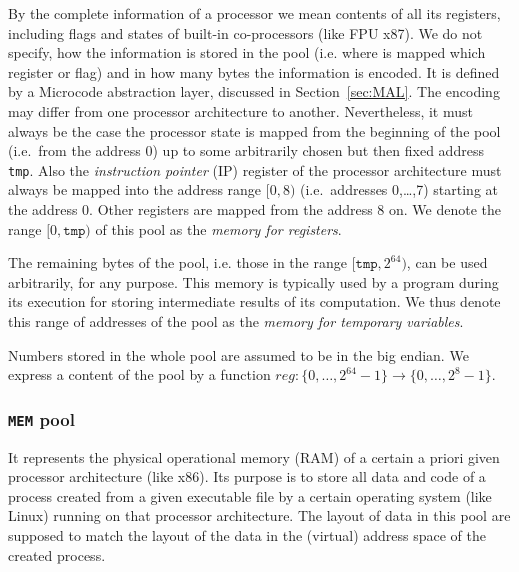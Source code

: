 \documentclass[10pt,twocolumn]{article}
\begin{document}
By the complete information of a processor we mean contents of all its
registers, including flags and states of built-in co-processors (like FPU x87).
We do not specify, how the information is stored in the pool (i.e. where is
mapped which register or flag) and in how many bytes the information is encoded.
It is defined by a Microcode abstraction layer, discussed in
Section~\ref{sec:MAL}. The encoding may differ from one processor
architecture to another. Nevertheless, it must always be the case the processor
state is mapped from the beginning of the pool (i.e.~from the address 0) up to
some arbitrarily chosen but then fixed address \texttt{tmp}. Also the
\emph{instruction pointer} (IP) register of the processor architecture must
always be mapped into the address range $ [0,8) $ (i.e.~addresses 0,\ldots,7)
starting at the address 0. Other registers are mapped from the address 8 on. We
denote the range $ [0,\texttt{tmp}) $ of this pool as the \emph{memory for
registers}.

The remaining bytes of the pool, i.e. those in the range $ [\texttt{tmp},2^{64})
$, can be used arbitrarily, for any purpose. This memory is typically used by a
program during its execution for storing intermediate results of its
computation. We thus denote this range of addresses of the pool as the
\emph{memory for temporary variables}.

Numbers stored in the whole pool are assumed to be in the big endian. We express
a content of the pool by a function $ \mathit{reg}: \{ 0, \ldots, 2^{64}-1 \}
\rightarrow \{ 0, \ldots, 2^{8}-1 \}$.


\subsubsection{\texttt{MEM} pool}
\label{sec:microcode:memory:MEM}

It represents the physical operational memory (RAM) of a certain a priori given
processor architecture (like x86). Its purpose is to store all data and code of
a process created from a given executable file by a certain operating system
(like Linux) running on that processor architecture. The layout of data in this
pool are supposed to match the layout of the data in the (virtual) address space
of the created process.
\end{document}

